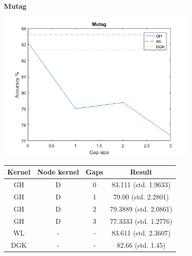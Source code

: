 \documentclass{article}
\begin{document}
\textbf{Mutag}\\
\begin{minipage}{0.6\linewidth}
		\hspace*{-1in}
		\includegraphics[width=10cm]{mutag}
		\label{fig:mutag}
\end{minipage}
\begin{minipage}[c]{0.5\linewidth}
	
	\centering
	\begin{tabular}{c|c|c|c}
			Kernel & Node kernel & Gaps &  Result\\
			\hline
			GH & D & 0 & 83.111 (std. 1.9633)\\
			GH & D & 1 & 79.00 (std. 2.2801)\\
			GH & D & 2 & 79.3889 (std. 2.0861)\\
			GH & D & 3 &  77.3333 (std. 1.2776)\\
			WL & - & - & 83.611 (std. 2.3607)\\
			DGK & - & - & 82.66 (std. 1.45)
		\end{tabular}
	\label{table:mutag}
\end{minipage}
\end{document}
